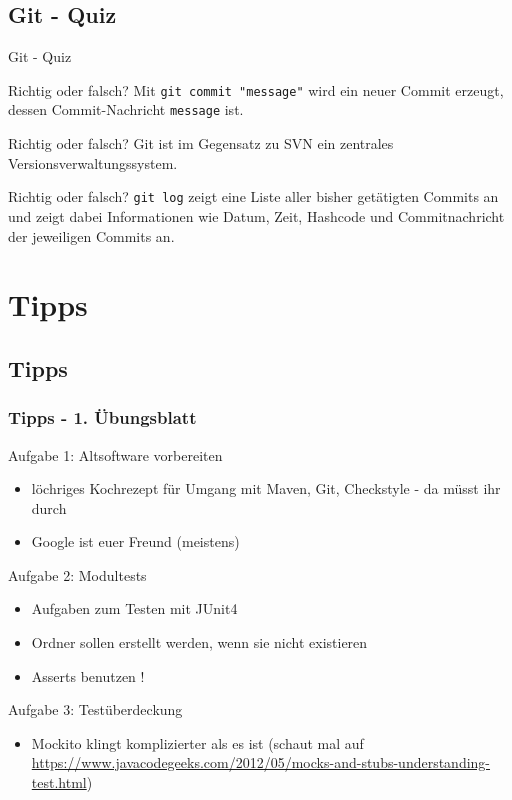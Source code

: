 \documentclass[18pt]{beamer}
\begin{document}
	\subsection{Git - Quiz}
	\begin{frame}{Git - Quiz}
		\begin{block}{Richtig oder falsch?}
			Mit \texttt{git commit "message"} wird ein neuer Commit erzeugt, dessen Commit-Nachricht \texttt{message} ist.
		\end{block}
		\pause
		\begin{block}{Richtig oder falsch?}
			Git ist im Gegensatz zu SVN ein zentrales Versionsverwaltungssystem.
		\end{block}
		\pause
		\begin{block}{Richtig oder falsch?}
			\texttt{git log} zeigt eine Liste aller bisher getätigten Commits an und zeigt dabei Informationen wie Datum, Zeit, Hashcode und Commitnachricht der jeweiligen Commits an.
		\end{block}
	\end{frame}
		
\section{Tipps}
	\subsection{Tipps}
	\begin{frame}
		\frametitle{Tipps - 1. Übungsblatt}
		\begin{small}
			\begin{exampleblock}{Aufgabe 1: Altsoftware vorbereiten}
				\begin{itemize}
					\item löchriges Kochrezept für Umgang mit Maven, Git, Checkstyle - da müsst ihr durch
					\item Google ist euer Freund (meistens)
				\end{itemize}
			\end{exampleblock}
			\pause
			\begin{exampleblock}{Aufgabe 2: Modultests}
				\begin{itemize}
					\item Aufgaben zum Testen mit JUnit4
					\item Ordner sollen erstellt werden, wenn sie nicht existieren
					\item Asserts benutzen !
				\end{itemize}
			\end{exampleblock}
			\pause
			\begin{exampleblock}{Aufgabe 3: Testüberdeckung}
				\begin{itemize}
					\item Mockito klingt komplizierter als es ist (schaut mal auf \url{https://www.javacodegeeks.com/2012/05/mocks-and-stubs-understanding-test.html})
				\end{itemize}
			\end{exampleblock}
		\end{small}
	\end{frame}
	
\end{document}
